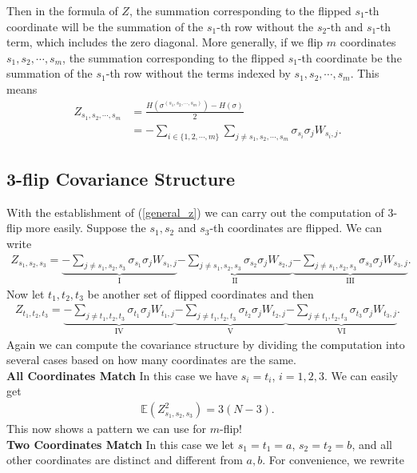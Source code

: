 \documentclass[10pt]{article}
\newcommand{\e}{\mathbb{E}}
\newenvironment{Proof of lemma}{\noindent{\bf Proof of Lemma}}{\hfill$\Box$\newline}
\newenvironment{Proof of claim}{\noindent{\bf Proof of claim}}{\hfill$\Box$\newline}
\newenvironment{Proof of theorem}{\noindent{\bf Proof of Theorem}}{\hfill\scriptsize{$\Box$}\newline}
\newenvironment{Proof of theorems}{\noindent{\bf Proof of Theorems}}{\hfill$\Box$\newline}
\newenvironment{Proof of proposition}{\noindent{\bf Proof of Proposition}}{\hfill$\Box$\newline}
\newenvironment{Proof of propositions}{\noindent{\bf Proof of Propositions}}{\hfill$\Box$\newline}
\newenvironment{Proof of exercise}{\noindent{\it Proof of Exercise:}}{\hfill$\Box$}
\numberwithin{equation}{section}
\begin{document}
Then in the formula of $Z$, the summation corresponding to the flipped $s_1$-th coordinate will be the summation of the $s_1$-th row without the $s_2$-th and $s_1$-th term, which includes the zero diagonal. More generally, if we flip $m$ coordinates ${s_1,s_2,\cdots,s_m}$, the summation corresponding to the flipped $s_1$-th coordinate be the summation of the $s_1$-th row without the terms indexed by ${s_1,s_2,\cdots,s_m}$. This means
\begin{align} \label{general_z}
    Z_{s_1,s_2,\cdots,s_m} &= \frac{H(\sigma^{(s_1,s_2,\cdots,s_m)})-H(\sigma)}{2} \nonumber \\
    &= -\sum_{i \in \{1,2,\cdots,m\}} \sum_{j \neq s_1,s_2,\cdots,s_m} \sigma_{s_i} \sigma_j W_{s_i,j}.
\end{align}
\subsection{3-flip Covariance Structure}
With the establishment of (\ref{general_z}) we can carry out the computation of 3-flip more easily. Suppose the $s_1,s_2$ and $s_3$-th coordinates are flipped. We can write
\begin{align}
    Z_{s_1,s_2,s_3} = \underbrace{- \sum_{j \neq s_1,s_2,s_3} \sigma_{s_1} \sigma_j W_{s_1,j}}_\text{I} \underbrace{- \sum_{j \neq s_1,s_2,s_3} \sigma_{s_2} \sigma_j W_{s_2,j}}_\text{II} \underbrace{- \sum_{j \neq s_1,s_2,s_3} \sigma_{s_3} \sigma_j W_{s_3,j}}_\text{III}.
\end{align}
Now let $t_1,t_2,t_3$ be another set of flipped coordinates and then
\begin{align}
    Z_{t_1,t_2,t_3} = \underbrace{- \sum_{j \neq t_1,t_2,t_3} \sigma_{t_1} \sigma_j W_{t_1,j}}_\text{IV} \underbrace{- \sum_{j \neq t_1,t_2,t_3} \sigma_{t_2} \sigma_j W_{t_2,j}}_\text{V} \underbrace{- \sum_{j \neq t_1,t_2,t_3} \sigma_{t_3} \sigma_j W_{t_3,j}}_\text{VI}.
\end{align}
Again we can compute the covariance structure by dividing the computation into several cases based on how many coordinates are the same.\\
\textbf{All Coordinates Match} In this case we have $s_i = t_i$, $i=1,2,3$. We can easily get
\begin{align}
    \e(Z_{s_1,s_2,s_3}^2) = 3(N-3).
\end{align}
This now shows a pattern we can use for $m$-flip!\\
\textbf{Two Coordinates Match} In this case we let $s_1 = t_1 =a$, $s_2 = t_2 =b$, and all other coordinates are distinct and different from $a,b$. For convenience, we rewrite
\end{document}
